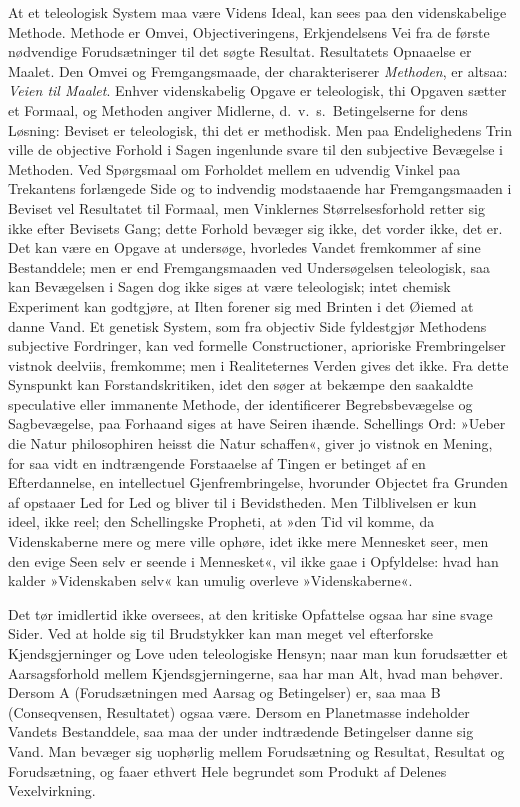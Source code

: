 \documentclass[12pt]{book}
\newcommand{\apage}[1]{\marginnote{\footnotesize\textit{[#1]}}}
\begin{document}
At et teleologisk System maa være Videns Ideal, kan sees paa den
videnskabelige Methode. Methode er Omvei, Objectiveringens, Erkjendelsens
Vei fra de første nødvendige Forudsætninger til det søgte Resultat.
Resultatets Opnaaelse er Maalet. Den Omvei og Fremgangsmaade, der
charakteriserer \emph{Methoden}, er altsaa: \emph{Veien til Maalet}. Enhver videnskabelig
Opgave er teleologisk, thi Opgaven sætter et Formaal, og Methoden angiver
Midlerne, d.\ v.\ s.\ Betingelserne for dens Løsning: Beviset er teleologisk,
thi det er methodisk. Men paa Endelighedens Trin ville de objective Forhold
i Sagen ingenlunde svare til den subjective Bevægelse i Methoden. Ved
Spørgsmaal om Forholdet mellem en udvendig Vinkel paa Trekantens forlængede
Side og to indvendig modstaaende har Fremgangsmaaden i Beviset vel
Resultatet til Formaal, men Vinklernes Størrelsesforhold retter sig ikke
efter Bevisets Gang; dette Forhold bevæger sig ikke, det vorder ikke, det
er. Det kan være en Opgave at undersøge, hvorledes Vandet fremkommer af
sine Bestanddele; men er end Fremgangsmaaden ved Undersøgelsen teleologisk,
saa kan Bevægelsen i Sagen dog ikke siges at være  \apage{72} teleologisk; intet
chemisk Experiment kan godtgjøre, at Ilten forener sig med Brinten i det
Øiemed at danne Vand. Et genetisk System, som fra objectiv Side
fyldestgjør Methodens subjective Fordringer, kan ved formelle
Constructioner, aprioriske Frembringelser vistnok deelviis, fremkomme; men
i Realiteternes Verden gives det ikke. Fra dette Synspunkt kan
Forstandskritiken, idet den søger at bekæmpe den saakaldte speculative
eller immanente Methode, der identificerer Begrebsbevægelse og
Sagbevægelse, paa Forhaand siges at have Seiren ihænde. Schellings Ord:
»Ueber die Natur philosophiren heisst die Natur schaffen«, giver jo
vistnok en Mening, for saa vidt en indtrængende Forstaaelse af Tingen er
betinget af en Efterdannelse, en intellectuel Gjenfrembringelse, hvorunder
Objectet fra Grunden af opstaaer Led for Led og bliver til i Bevidstheden.
Men Tilblivelsen er kun ideel, ikke reel; den Schellingske Propheti, at
»den Tid vil komme, da Videnskaberne mere og mere ville ophøre, idet ikke
mere Mennesket seer, men den evige Seen selv er seende i Mennesket«, vil
ikke gaae i Opfyldelse: hvad han kalder »Videnskaben selv« kan umulig
overleve »Videnskaberne«.

Det tør imidlertid ikke oversees, at den kritiske Opfattelse ogsaa har
sine svage Sider. Ved at holde sig til Brudstykker kan man meget vel
efterforske Kjendsgjerninger og Love uden teleologiske Hensyn; naar man
kun forudsætter et Aarsagsforhold mellem Kjendsgjerningerne, saa har man
Alt, hvad man behøver. Dersom A (Forudsætningen med Aarsag og Betingelser) \apage{73} 
er, saa maa B (Conseqvensen, Resultatet) ogsaa være. Dersom en Planetmasse
indeholder Vandets Bestanddele, saa maa der under indtrædende Betingelser
danne sig Vand. Man bevæger sig uophørlig mellem Forudsætning og Resultat,
Resultat og Forudsætning, og faaer ethvert Hele begrundet som Produkt af
Delenes Vexelvirkning.
\end{document}
